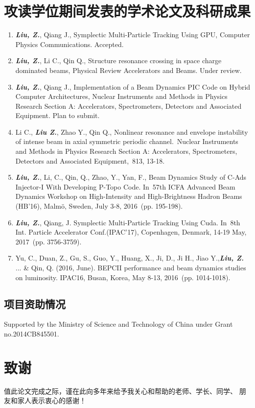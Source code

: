 \chapter{攻读学位期间发表的学术论文及科研成果}
\begin{enumerate}
  \item \textbf{\textit{Liu, Z.}}, Qiang J., Symplectic Multi-Particle Tracking Using GPU, Computer Physics Communications. \color{red}Accepted\color{black}.
  \item \textbf{\textit{Liu, Z.}}, Li C., Qin Q., Structure resonance crossing in space charge dominated beams, Physical Review Accelerators and Beams. \color{red}Under review\color{black}.
  \item \textbf{\textit{Liu, Z.}}, Qiang J., Implementation of a Beam Dynamics PIC Code on Hybrid Computer Architectures, Nuclear Instruments and Methods in Physics Research Section A: Accelerators, Spectrometers, Detectors and Associated Equipment. \color{red}Plan to submit\color{black}.
  \item Li C., \textbf{\textit{Liu Z.}}, Zhao Y., Qin Q., Nonlinear resonance and envelope instability of intense beam in axial symmetric periodic channel. Nuclear Instruments and Methods in Physics Research Section A: Accelerators, Spectrometers, Detectors and Associated Equipment, 813, 13-18.
  \item \textbf{\textit{Liu, Z.}}, Li, C., Qin, Q., Zhao, Y., Yan, F., Beam Dynamics Study of C-Ads Injector-I With Developing P-Topo Code. In 57th ICFA Advanced Beam Dynamics Workshop on High-Intensity and High-Brightness Hadron Beams (HB'16), Malmö, Sweden, July 3-8, 2016 (pp. 195-198).
  \item \textbf{\textit{Liu, Z.}}, Qiang, J. Symplectic Multi-Particle Tracking Using Cuda. In 8th Int. Particle Accelerator Conf.(IPAC'17), Copenhagen, Denmark, 14-19 May, 2017 (pp. 3756-3759).
  \item Yu, C., Duan, Z., Gu, S., Guo, Y., Huang, X., Ji, D., Ji H., Jiao Y.,\textbf{\textit{Liu, Z.}} ... \& Qin, Q. (2016, June). BEPCII performance and beam dynamics studies on luminosity. IPAC16, Busan, Korea, May 8-13, 2016 (pp. 1014-1018).
\end{enumerate}



\section*{项目资助情况}

Supported by the Ministry of Science and Technology of China under Grant no.2014CB845501.
\chapter{致\quad 谢}

值此论文完成之际，谨在此向多年来给予我关心和帮助的老师、学长、同学、
朋友和家人表示衷心的感谢！


